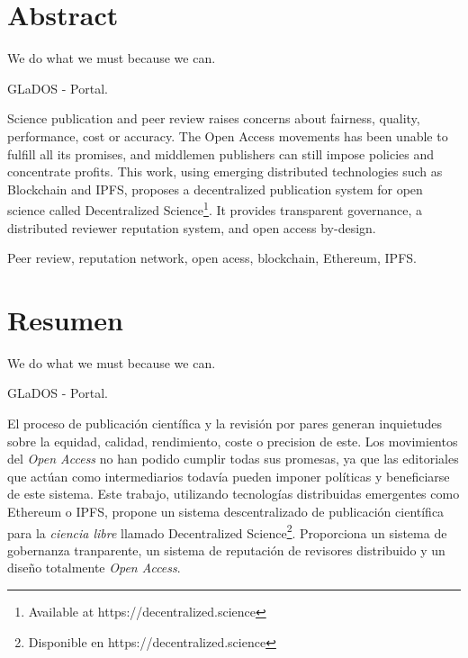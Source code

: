 %
%
%
%
%

\chapter{Abstract}

\begin{FraseCelebre}
  \begin{Frase}
    We do what we must because we can.
  \end{Frase}
  \begin{Fuente}
    GLaDOS - Portal.
  \end{Fuente}
\end{FraseCelebre}

Science publication and peer review raises concerns about fairness, quality,
performance, cost or accuracy. The Open Access movements has been unable to
fulfill all its promises, and middlemen publishers can still impose policies and
concentrate profits. This work, using emerging distributed technologies such as
Blockchain and IPFS, proposes a decentralized publication system for open
science called Decentralized Science\footnote{Available at
  https://decentralized.science}. It provides transparent governance, a
distributed reviewer reputation system, and open access by-design.

 Peer review, reputation network, open acess, blockchain,
Ethereum, IPFS.


\chapter{Resumen}

\begin{FraseCelebre}
  \begin{Frase}
    We do what we must because we can.
  \end{Frase}
  \begin{Fuente}
    GLaDOS - Portal.
  \end{Fuente}
\end{FraseCelebre}

El proceso de publicación científica y la revisión por pares generan inquietudes
sobre la equidad, calidad, rendimiento, coste o precision de este. Los movimientos del
\emph{Open Access} no han podido cumplir todas sus promesas, ya que las
editoriales que actúan como 
intermediarios todavía pueden imponer políticas y beneficiarse de este sistema.
Este trabajo, utilizando tecnologías distribuidas emergentes como Ethereum o
IPFS, propone un sistema descentralizado de publicación científica para la
\emph{ciencia libre} llamado Decentralized Science\footnote{Disponible en
  https://decentralized.science}. Proporciona un sistema de gobernanza
tranparente, un sistema de reputación de revisores distribuido y un diseño
totalmente \emph{Open Access}.

